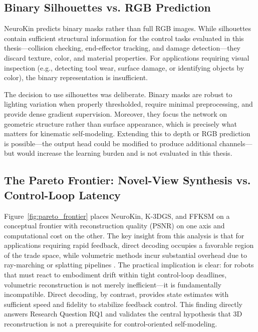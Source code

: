 \documentclass[12pt,a4paper,oneside]{report}
\begin{document}
\subsection{Binary Silhouettes vs. RGB Prediction}
\label{subsec:binary_silhouettes_vs_rgb_prediction}

NeuroKin predicts binary masks rather than full RGB images. While silhouettes contain sufficient structural information for the control tasks evaluated in this thesis—collision checking, end-effector tracking, and damage detection—they discard texture, color, and material properties. For applications requiring visual inspection (e.g., detecting tool wear, surface damage, or identifying objects by color), the binary representation is insufficient.

The decision to use silhouettes was deliberate. Binary masks are robust to lighting variation when properly thresholded, require minimal preprocessing, and provide dense gradient supervision. Moreover, they focus the network on geometric structure rather than surface appearance, which is precisely what matters for kinematic self-modeling. Extending this to depth or RGB prediction is possible—the output head could be modified to produce additional channels—but would increase the learning burden and is not evaluated in this thesis.

\subsection{The Pareto Frontier: Novel-View Synthesis vs. Control-Loop Latency}
\label{subsec:the_pareto_frontier_novel_view_synthesis_vs_control_loop_latency}

Figure~\ref{fig:pareto_frontier} places NeuroKin, K-3DGS, and FFKSM on a conceptual frontier with reconstruction quality (PSNR) on one axis and computational cost on the other. The key insight from this analysis is that for applications requiring rapid feedback, direct decoding occupies a favorable region of the trade space, while volumetric methods incur substantial overhead due to ray-marching or splatting pipelines \cite{kerbl20233d, hu2025learning}. The practical implication is clear: for robots that must react to embodiment drift within tight control-loop deadlines, volumetric reconstruction is not merely inefficient—it is fundamentally incompatible. Direct decoding, by contrast, provides state estimates with sufficient speed and fidelity to stabilize feedback control. This finding directly answers Research Question RQ1 and validates the central hypothesis that 3D reconstruction is not a prerequisite for control-oriented self-modeling.
\end{document}
